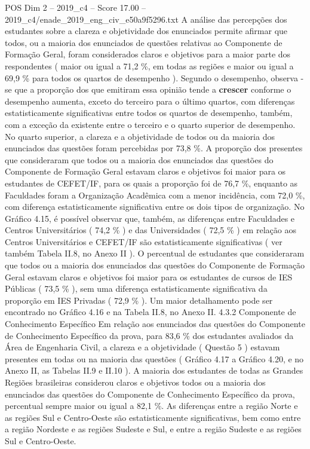 \begin{textsample}{POS Dim 2 – 2019\_c4 – Score 17.00 – 2019\_c4/enade\_2019\_eng\_civ\_e50a9f5296.txt}
A análise das percepções dos estudantes sobre a clareza e objetividade dos enunciados permite afirmar que todos, ou a maioria dos enunciados de questões relativas ao Componente de Formação Geral, foram considerados claros e objetivos para a maior parte dos respondentes ( maior ou igual a 71,2 \%, em todas as regiões e maior ou igual a 69,9 \% para todos os quartos de desempenho ).
Segundo o desempenho, observa -se que a proporção dos que emitiram essa opinião tende a \textbf{crescer} conforme o desempenho aumenta, exceto do terceiro para o último quartos, com diferenças estatisticamente significativas entre todos os quartos de desempenho, também, com a exceção da existente entre o terceiro e o quarto superior de desempenho.
No quarto superior, a clareza e a objetividade de todos ou da maioria dos enunciados das questões foram percebidas por 73,8 \%.
A proporção dos presentes que consideraram que todos ou a maioria dos enunciados das questões do Componente de Formação Geral estavam claros e objetivos foi maior para os estudantes de CEFET/IF, para os quais a proporção foi de 76,7 \%, enquanto as Faculdades foram a Organização Acadêmica com a menor incidência, com 72,0 \%, com diferença estatisticamente significativa entre os dois tipos de organização.
No Gráfico 4.15, é possível observar que, também, as diferenças entre Faculdades e Centros Universitários ( 74,2 \% ) e das Universidades ( 72,5 \% ) em relação aos Centros Universitários e CEFET/IF são estatisticamente significativas ( ver também Tabela II.8, no Anexo II ).
O percentual de estudantes que consideraram que todos ou a maioria dos enunciados das questões do Componente de Formação Geral estavam claros e objetivos foi maior para os estudantes de cursos de IES Públicas ( 73,5 \% ), sem uma diferença estatisticamente significativa da proporção em IES Privadas ( 72,9 \% ).
Um maior detalhamento pode ser encontrado no Gráfico 4.16 e na Tabela II.8, no Anexo II. 4.3.2 Componente de Conhecimento Específico Em relação aos enunciados das questões do Componente de Conhecimento Específico da prova, para 83,6 \% dos estudantes avaliados da Área de Engenharia Civil, a clareza e a objetividade ( Questão 5 ) estavam presentes em todas ou na maioria das questões ( Gráfico 4.17 a Gráfico 4.20, e no Anexo II, as Tabelas II.9 e II.10 ).
A maioria dos estudantes de todas as Grandes Regiões brasileiras considerou claros e objetivos todos ou a maioria dos enunciados das questões do Componente de Conhecimento Específico da prova, percentual sempre maior ou igual a 82,1 \%.
As diferenças entre a região Norte e as regiões Sul e Centro-Oeste são estatisticamente significativas, bem como entre a região Nordeste e as regiões Sudeste e Sul, e entre a região Sudeste e as regiões Sul e Centro-Oeste.

\end{textsample}
